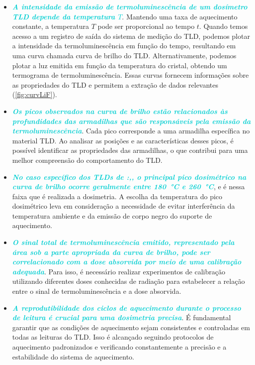 \documentclass[11pt,a4paper]{article}
\newcounter{exemplo}
\begin{document}
	\begin{exemplo}
		\begin{itemize}
			\item \textcolor{DarkTurquoise}{\textit{\textbf{A intensidade da emissão de termoluminescência de um dosímetro TLD depende da temperatura $T$}}}. Mantendo uma taxa de aquecimento constante, a temperatura $T$ pode ser proporcional ao tempo $t$. Quando temos acesso a um registro de saída do sistema de medição do TLD, podemos plotar a intensidade da termoluminescência em função do tempo, resultando em uma curva chamada curva de brilho do TLD. Alternativamente, podemos plotar a luz emitida em função da temperatura do cristal, obtendo um termograma de termoluminescência. Essas curvas fornecem informações sobre as propriedades do TLD e permitem a extração de dados relevantes (\ref{fig:curvLiF}).
		  
			\item \textcolor{DarkTurquoise}{\textit{\textbf{Os picos observados na curva de brilho estão relacionados às profundidades das armadilhas que são responsáveis pela emissão da termoluminescência}}}. Cada pico corresponde a uma armadilha específica no material TLD. Ao analisar as posições e as características desses picos, é possível identificar as propriedades das armadilhas, o que contribui para uma melhor compreensão do comportamento do TLD.
		  
			\item \textcolor{DarkTurquoise}{\textit{\textbf{No caso específico dos TLDs de :,, o principal pico dosimétrico na curva de brilho ocorre geralmente entre \SI{180}{\celsius} e \SI{260}{\celsius}}}}, e é nessa faixa que é realizada a dosimetria. A escolha da temperatura do pico dosimétrico leva em consideração a necessidade de evitar interferência da temperatura ambiente e da emissão de corpo negro do suporte de aquecimento.
		  
			\item \textcolor{DarkTurquoise}{\textit{\textbf{O sinal total de termoluminescência emitido, representado pela área sob a parte apropriada da curva de brilho, pode ser correlacionado com a dose absorvida por meio de uma calibração adequada}}}. Para isso, é necessário realizar experimentos de calibração utilizando diferentes doses conhecidas de radiação para estabelecer a relação entre o sinal de termoluminescência e a dose absorvida.
		  
			\item \textcolor{DarkTurquoise}{\textit{\textbf{A reprodutibilidade dos ciclos de aquecimento durante o processo de leitura é crucial para uma dosimetria precisa}}}. É fundamental garantir que as condições de aquecimento sejam consistentes e controladas em todas as leituras do TLD. Isso é alcançado seguindo protocolos de aquecimento padronizados e verificando constantemente a precisão e a estabilidade do sistema de aquecimento.
		  

\end{itemize}
\end{exemplo}
\end{document}
